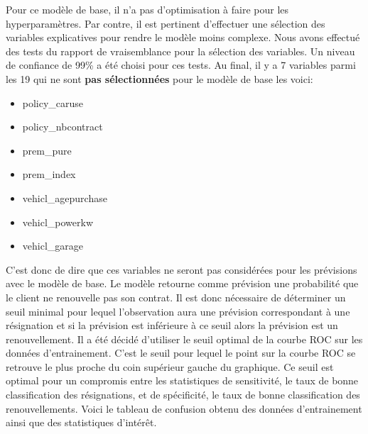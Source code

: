 \documentclass[]{article}
\begin{document}
Pour ce modèle de base, il n'a pas d'optimisation à faire pour les
hyperparamètres. Par contre, il est pertinent d'effectuer une sélection
des variables explicatives pour rendre le modèle moins complexe. Nous
avons effectué des tests du rapport de vraisemblance pour la sélection
des variables. Un niveau de confiance de 99\% a été choisi pour ces
tests. Au final, il y a 7 variables parmi les 19 qui ne sont \textbf{pas
sélectionnées} pour le modèle de base les voici:

\begin{multicols}{2}
\begin{itemize}
\item policy\_caruse
\item policy\_nbcontract
\item prem\_pure
\item prem\_index
\end{itemize}
\columnbreak
\begin{itemize}
\item vehicl\_agepurchase
\item vehicl\_powerkw
\item vehicl\_garage
\end{itemize}
\end{multicols}

C'est donc de dire que ces variables ne seront pas considérées pour les
prévisions avec le modèle de base. Le modèle retourne comme prévision
une probabilité que le client ne renouvelle pas son contrat. Il est donc
nécessaire de déterminer un seuil minimal pour lequel l'observation aura
une prévision correspondant à une résignation et si la prévision est
inférieure à ce seuil alors la prévision est un renouvellement. Il a été
décidé d'utiliser le seuil optimal de la courbe ROC sur les données
d'entrainement. C'est le seuil pour lequel le point sur la courbe ROC se
retrouve le plus proche du coin supérieur gauche du graphique. Ce seuil
est optimal pour un compromis entre les statistiques de sensitivité, le
taux de bonne classification des résignations, et de spécificité, le
taux de bonne classification des renouvellements. Voici le tableau de
confusion obtenu des données d'entrainement ainsi que des statistiques
d'intérêt.
\end{document}
